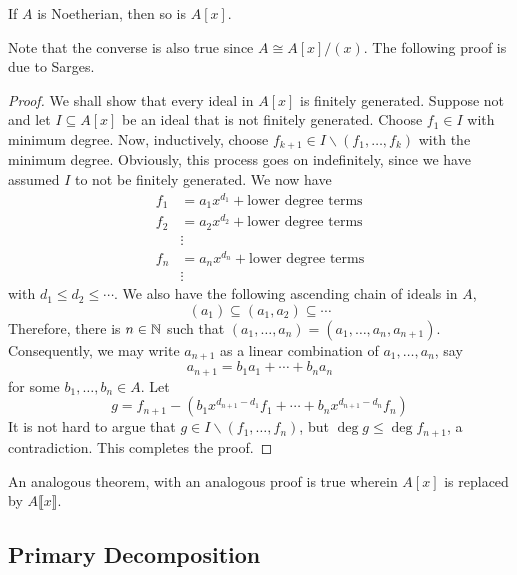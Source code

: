 \begin{theorem}
    If $A$ is Noetherian, then so is $A[x]$.
\end{theorem}
Note that the converse is also true since $A\cong A[x]/(x)$. The following proof is due to Sarges.
\begin{proof}
    We shall show that every ideal in $A[x]$ is finitely generated. Suppose not and let $I\subseteq A[x]$ be an ideal that is not finitely generated. Choose $f_1\in I$ with minimum degree. Now, inductively, choose $f_{k + 1}\in I\backslash(f_1,\ldots,f_k)$ with the minimum degree. Obviously, this process goes on indefinitely, since we have assumed $I$ to not be finitely generated. We now have 
    \begin{align*}
        f_1 &= a_1x^{d_1} + \text{lower degree terms}\\
        f_2 &= a_2x^{d_2} + \text{lower degree terms}\\
        &\vdots\\
        f_n &= a_nx^{d_n} + \text{lower degree terms}\\
        &\vdots
    \end{align*}
    with $d_1\le d_2\le\cdots$. We also have the following ascending chain of ideals in $A$, 
    \begin{equation*}
        (a_1)\subseteq(a_1,a_2)\subseteq\cdots
    \end{equation*}
    Therefore, there is $n\in\mathbb{N}$ such that $(a_1,\ldots,a_n) = (a_1,\ldots,a_n,a_{n + 1})$. Consequently, we may write $a_{n + 1}$ as a linear combination of $a_1,\ldots,a_n$, say 
    \begin{equation*}
        a_{n + 1} = b_1a_1 + \cdots + b_na_n
    \end{equation*}
    for some $b_1,\ldots,b_n\in A$. Let 
    \begin{equation*}
        g = f_{n + 1} - (b_1x^{d_{n + 1} - d_1}f_1 + \cdots + b_nx^{d_{n + 1} - d_n}f_n)
    \end{equation*}
    It is not hard to argue that $g\in I\backslash(f_1,\ldots,f_n)$, but $\deg g\le\deg f_{n + 1}$, a contradiction. This completes the proof.
\end{proof}

An analogous theorem, with an analogous proof is true wherein $A[x]$ is replaced by $A\llbracket x\rrbracket$.

\subsection{Primary Decomposition}

